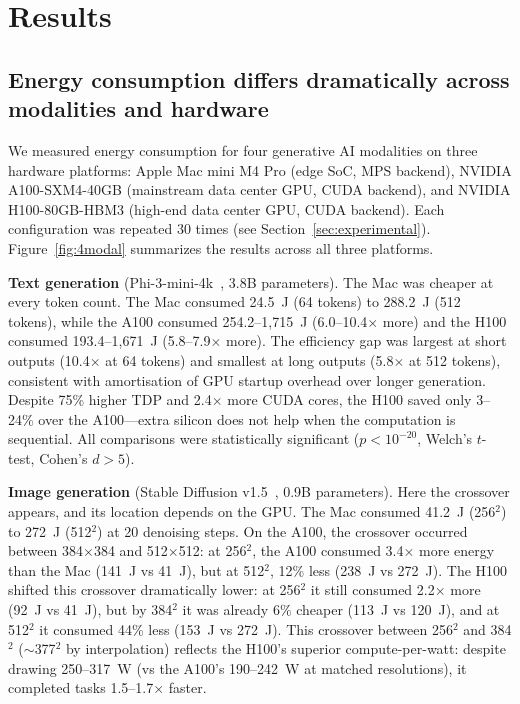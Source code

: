 \documentclass[preprint,12pt]{elsarticle}
\begin{document}
\section{Results}
\label{sec:results}

\subsection{Energy consumption differs dramatically across modalities and hardware}

We measured energy consumption for four generative AI modalities on three hardware platforms: Apple Mac mini M4 Pro (edge SoC, MPS backend), NVIDIA A100-SXM4-40GB (mainstream data center GPU, CUDA backend), and NVIDIA H100-80GB-HBM3 (high-end data center GPU, CUDA backend). Each configuration was repeated 30 times (see Section~\ref{sec:experimental}). Figure~\ref{fig:4modal} summarizes the results across all three platforms.

\textbf{Text generation} (Phi-3-mini-4k~\cite{abdin2024phi3}, 3.8B parameters). The Mac was cheaper at every token count. The Mac consumed 24.5~J (64 tokens) to 288.2~J (512 tokens), while the A100 consumed 254.2--1,715~J (6.0--10.4$\times$ more) and the H100 consumed 193.4--1,671~J (5.8--7.9$\times$ more). The efficiency gap was largest at short outputs (10.4$\times$ at 64 tokens) and smallest at long outputs (5.8$\times$ at 512 tokens), consistent with amortisation of GPU startup overhead over longer generation. Despite 75\% higher TDP and 2.4$\times$ more CUDA cores, the H100 saved only 3--24\% over the A100---extra silicon does not help when the computation is sequential. All comparisons were statistically significant ($p < 10^{-20}$, Welch's $t$-test, Cohen's $d > 5$).

\textbf{Image generation} (Stable Diffusion v1.5~\cite{rombach2022high}, 0.9B parameters). Here the crossover appears, and its location depends on the GPU. The Mac consumed 41.2~J (256$^2$) to 272~J (512$^2$) at 20 denoising steps. On the A100, the crossover occurred between 384$\times$384 and 512$\times$512: at 256$^2$, the A100 consumed 3.4$\times$ more energy than the Mac (141~J vs 41~J), but at 512$^2$, 12\% less (238~J vs 272~J). The H100 shifted this crossover dramatically lower: at 256$^2$ it still consumed 2.2$\times$ more (92~J vs 41~J), but by 384$^2$ it was already 6\% cheaper (113~J vs 120~J), and at 512$^2$ it consumed 44\% less (153~J vs 272~J). This crossover between 256$^2$ and 384$^2$ ($\sim$377$^2$ by interpolation) reflects the H100's superior compute-per-watt: despite drawing 250--317~W (vs the A100's 190--242~W at matched resolutions), it completed tasks 1.5--1.7$\times$ faster.
\end{document}
